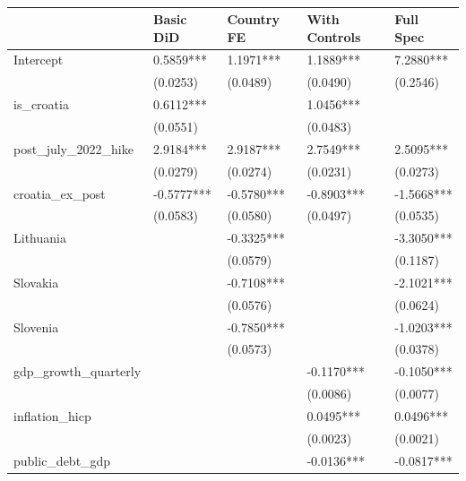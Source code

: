 \begin{table}
\caption{}
\label{}
\begin{center}
\begin{tabular}{lllll}
\hline
                        & Basic DiD  & Country FE & With Controls & Full Spec   \\
\hline
Intercept               & 0.5859***  & 1.1971***  & 1.1889***     & 7.2880***   \\
                        & (0.0253)   & (0.0489)   & (0.0490)      & (0.2546)    \\
is\_croatia             & 0.6112***  &            & 1.0456***     &             \\
                        & (0.0551)   &            & (0.0483)      &             \\
post\_july\_2022\_hike  & 2.9184***  & 2.9187***  & 2.7549***     & 2.5095***   \\
                        & (0.0279)   & (0.0274)   & (0.0231)      & (0.0273)    \\
croatia\_ex\_post       & -0.5777*** & -0.5780*** & -0.8903***    & -1.5668***  \\
                        & (0.0583)   & (0.0580)   & (0.0497)      & (0.0535)    \\
Lithuania &            & -0.3325*** &               & -3.3050***  \\
                        &            & (0.0579)   &               & (0.1187)    \\
Slovakia  &            & -0.7108*** &               & -2.1021***  \\
                        &            & (0.0576)   &               & (0.0624)    \\
Slovenia  &            & -0.7850*** &               & -1.0203***  \\
                        &            & (0.0573)   &               & (0.0378)    \\
gdp\_growth\_quarterly  &            &            & -0.1170***    & -0.1050***  \\
                        &            &            & (0.0086)      & (0.0077)    \\
inflation\_hicp         &            &            & 0.0495***     & 0.0496***   \\
                        &            &            & (0.0023)      & (0.0021)    \\
public\_debt\_gdp       &            &            & -0.0136***    & -0.0817***  \\

\end{tabular}
\end{center}
\end{table}
